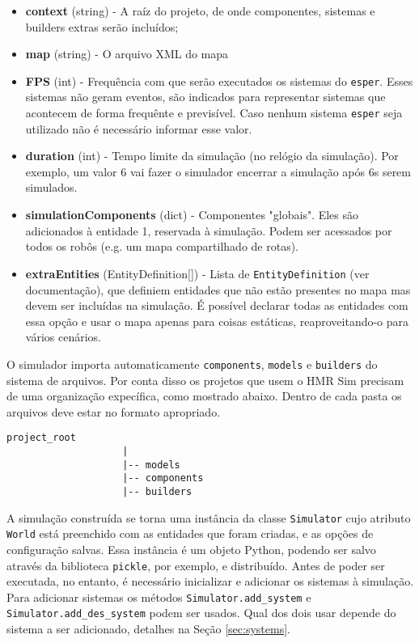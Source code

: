\begin{itemize}
    \item \textbf{context} (string) - A raíz do projeto, de onde componentes, sistemas e builders extras serão incluídos;
    \item \textbf{map} (string) - O arquivo XML do mapa
    \item \textbf{FPS} (int) - Frequência com que serão executados os sistemas do \texttt{esper}. Esses sistemas não geram eventos, são indicados para representar sistemas que acontecem de forma frequênte e previsível. Caso nenhum sistema \texttt{esper} seja utilizado não é necessário informar esse valor.
    \item \textbf{duration} (int) - Tempo limite da simulação (no relógio da simulação). Por exemplo, um valor 6 vai fazer o simulador encerrar a simulação após 6s serem simulados.
    \item \textbf{simulationComponents} (dict) - Componentes "globais". Eles são adicionados à entidade 1, reservada à simulação. Podem ser acessados por todos os robôs (e.g. um mapa compartilhado de rotas).
    \item \textbf{extraEntities} (EntityDefinition[]) - Lista de \texttt{EntityDefinition} (ver documentação), que definiem entidades que não estão presentes no mapa mas devem ser incluídas na simulação. É possível declarar todas as entidades com essa opção e usar o mapa apenas para coisas estáticas, reaproveitando-o para vários cenários. 
\end{itemize}

O simulador importa automaticamente \texttt{components}, \texttt{models} e \texttt{builders} do sistema de arquivos. Por conta disso os projetos que usem o HMR Sim precisam de uma organização expecífica, como mostrado abaixo. Dentro de cada pasta os arquivos deve estar no formato apropriado.

\begin{lstlisting}[]
                   project_root     
                    |                 
                    |-- models        
                    |-- components    
                    |-- builders      
\end{lstlisting}

A simulação construída se torna uma instância da classe \texttt{Simulator} cujo atributo \texttt{World} está preenchido com as entidades que foram criadas, e as opções de configuração salvas. Essa instância é um objeto Python, podendo ser salvo através da biblioteca \texttt{pickle}, por exemplo, e distribuído. Antes de poder ser executada, no entanto, é necessário inicializar e adicionar os sistemas à simulação. Para adicionar sistemas os métodos \texttt{Simulator.add\_system} e \texttt{Simulator.add\_des\_system} podem ser usados. Qual dos dois usar depende do sistema a ser adicionado, detalhes na Seção \ref{sec:systems}.

